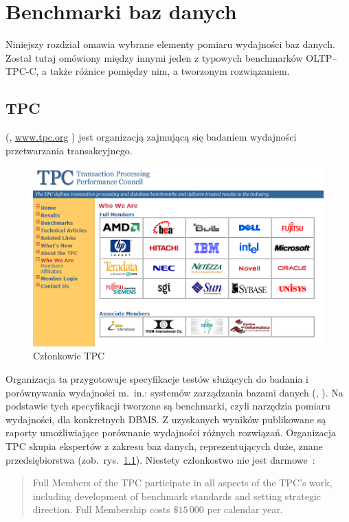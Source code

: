 \chapter{Benchmarki baz danych}\label{chap:teo}

Niniejszy rozdział omawia wybrane elementy pomiaru wydajności baz danych. Został tutaj 
omówiony między innymi jeden z typowych benchmarków OLTP--TPC-C, a także różnice pomiędzy nim, 
a tworzonym rozwiązaniem.

\section{TPC}

 (, \url{www.tpc.org} ) jest 
organizacją zajmującą się badaniem wydajności przetwarzania transakcyjnego.
\begin{figure}[t]
\begin{center}
\includegraphics[width=0.8\linewidth]{figures/tpc/tpc_members.png}
\end{center}
\caption{Członkowie TPC~\cite{TPC1}}\label{rys:tpc_members}
\end{figure}
Organizacja ta przygotowuje specyfikacje testów służących do badania i porównywania wydajności m.~in.: 
systemów zarządzania bazami danych (, ). Na podstawie tych specyfikacji tworzone są benchmarki, 
czyli narzędzia pomiaru wydajności, dla konkretnych DBMS. Z uzyskanych wyników publikowane są raporty 
umożliwiające porównanie wydajności różnych rozwiązań. Organizacja TPC skupia ekspertów z zakresu baz danych, reprezentujących
duże, znane przedsiębiorstwa (zob.~rys.~\ref{rys:tpc_members}). Niestety członkostwo nie jest darmowe~\cite{TPC1}:

\begin{quote}
Full Members of the TPC participate in all aspects of the TPC's work, including
development of benchmark standards and setting strategic direction. 
Full Membership costs $\$15\,000$ per calendar year.
\end{quote}

